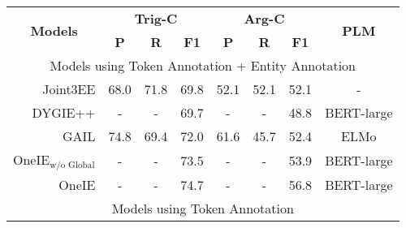 \documentclass[11pt,a4paper]{article}
\begin{document}
\begin{table*}[!t]
  \centering
  \begin{tabular}{r|ccc|ccc|c}
    \toprule
    \multicolumn{1}{c}{\multirow{2}[0]{*}{\textbf{Models}}} & \multicolumn{3}{c}{\textbf{Trig-C}} & \multicolumn{3}{c}{\textbf{Arg-C}} & \multirow{2}[0]{*}{\textbf{PLM}}                                                               \\
    \cmidrule(r){2-4} \cmidrule(r){5-7}
                                                            & \textbf{P}                          & \textbf{R}                         & \textbf{F1}                      & \textbf{P} & \textbf{R} & \textbf{F1} &                     \\
    \midrule
    \multicolumn{8}{c}{Models using Token Annotation + Entity Annotation}                                                                                                                                                               \\
    \midrule
    Joint3EE \citep{Nguyen-Nguyen:2019:AAAI2019}            & 68.0                                & 71.8                               & 69.8                             & 52.1       & 52.1       & 52.1        & -                   \\
    DYGIE++  \citep{wadden-etal-2019-entity}                & -                                   & -                                  & 69.7                             & -          & -          & 48.8        & BERT-large          \\
    GAIL \citep{Zhang:2019:GAIL}                            & 74.8                                & 69.4                               & 72.0                             & 61.6       & 45.7       & 52.4        & ELMo                \\
    OneIE$_{\text{w/o Global}}$ \citep{lin-etal-2020-joint} & -                                   & -                                  & 73.5                             & -          & -          & 53.9        & BERT-large          \\
    OneIE \citep{lin-etal-2020-joint}                       & -                                   & -                                  & 74.7                             & -          & -          & 56.8        & BERT-large          \\
    \midrule
    \multicolumn{8}{c}{Models using Token Annotation}                                                                                                                                                                                   \\

\end{tabular}
\end{table*}
\end{document}
